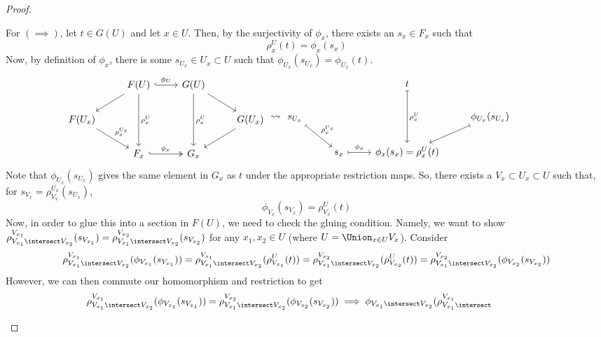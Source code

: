 \documentclass[11pt,leqno,oneside]{amsbook}
\renewcommand{\F}{F} %
\newcommand{\G}{G}
\numberwithin{thm}{section}
\begin{document}
\begin{proof}
\begin{enumerate}
    For \((\implies)\), let \(t \in \G(U)\) and let \(x \in U\). Then, by
    the surjectivity of \(\phi_x\), there
    exists an \(s_x \in \F_x\) such that \[
      \rho^U_x(t) = \phi_x(s_x)
    \]
    Now, by definition of \(\phi_x\),  there is some \(s_{U_x} \in U_x
    \subset U\) such
    that \(\phi_{U_x}(s_{U_x}) = \phi_{U_x}(t)\). 
    \[
      \hspace{-0.5in}
      \begin{tikzcd}
        & \F(U) \ar[ld] \ar[dd, "\rho^U_x"]\ar[r, "\phi_U", hookrightarrow]&
        \G(U) \ar[dd, "\rho^U_x"] \ar[rd]\\
        \F(U_x) \ar[rd, "\rho^{U_x}_x"] & & & \G(U_x) \ar[ld] \\
        & \F_x \ar[r, "\phi_x", twoheadrightarrow, hook]& \G_x
      \end{tikzcd}
      \rightsquigarrow
      \begin{tikzcd}
        & &t \ar[dd,mapsto, "\rho^U_x"] \\
        s_{U_x} \ar[rd,mapsto, "\rho^{U_x}_x"]& & &
        \phi_{U_x}(s_{U_x}) \ar[ld, mapsto]\\
        & s_x \ar[r, mapsto, "\phi_x"]& \phi_x(s_x) = \rho^U_x(t)
      \end{tikzcd}
    \]
    Note that \(\phi_{U_x}(s_{U_x})\) gives the same element in
    \(\G_x\) as \(t\) under the appropriate restriction maps. So,
    there exists a \(V_x \subset U_x \subset U\) such that, for \(s_{V_x} =
    \rho^{U_x}_{V_x}(s_{U_x})\), \[
      \phi_{V_x}(s_{V_x}) = \rho^U_{V_x}(t)
    \]
    Now, in order to glue this into a section in \(\F(U)\), we need to
    check the 
    gluing condition. Namely, we want to show
    \(\rho^{V_{x_1}}_{V_{x_1} \intersect V_{x_2}}(s_{V_{x_1}}) =
    \rho^{V_{x_2}}_{V_{x_1} \intersect V_{x_2}}(s_{V_{x_2}})\) for any
    \(x_1, x_2 \in U\) (where \(U = \Union_{x \in U}
    V_x\)). Consider \[
      \rho^{V_{x_1}}_{V_{x_1} \intersect
        V_{x_2}}(\phi_{V_{x_1}}(s_{V_{x_1}}))  =
      \rho^{V_{x_1}}_{V_{x_1} \intersect V_{x_2}}(\rho^U_{V_{x_1}}(t))
      = \rho^{V_{x_2}}_{V_{x_1} \intersect
        V_{x_2}}(\rho^U_{V_{x_2}}(t)) = \rho^{V_{x_2}}_{V_{x_1} \intersect
        V_{x_2}}(\phi_{V_{x_2}}(s_{V_{x_2}}))
    \]
    However, we can then commute our homomorphism and restriction to
    get \[
      \hspace{-0.5in} \rho^{V_{x_1}}_{V_{x_1} \intersect
        V_{x_2}}(\phi_{V_{x_1}}(s_{V_{x_1}})) = \rho^{V_{x_2}}_{V_{x_1} \intersect
        V_{x_2}}(\phi_{V_{x_2}}(s_{V_{x_2}})) \implies \phi_{V_{x_1}
        \intersect V_{x_2}}(\rho^{V_{x_1}}_{V_{x_1} \intersect
}\]
\end{enumerate}
\end{proof}
\end{document}
